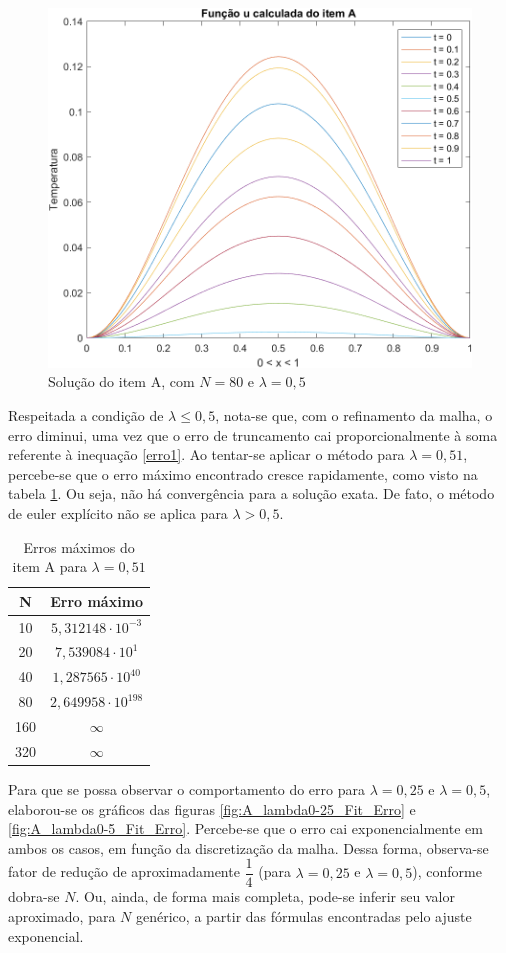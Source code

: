 \documentclass[12pt]{article}
\begin{document}
\begin{spacing}{1.5}
\newpage
\begin{figure}[ht!]
    \centering
    \includegraphics[width=0.5\linewidth]{Primeira_Tarefa/ItemA/itemA_2D.png}
    \caption{Solução do item A, com $N=80$ e $\lambda=0,5$}
    \label{fig:itemA_2D}
\end{figure}

Respeitada a condição de $\lambda \leq 0,5$, nota-se que, com o refinamento da malha, o erro diminui, uma vez que o erro de truncamento cai proporcionalmente à soma referente à inequação \eqref{erro1}. Ao tentar-se aplicar o método para $\lambda = 0,51$, percebe-se que o erro máximo encontrado cresce rapidamente, como visto na tabela \ref{table:A_erro_lambda0-51}. Ou seja, não há convergência para a solução exata. De fato, o método de euler explícito não se aplica para $\lambda > 0,5$.

\begin{table}[ht]
\centering 
\begin{tabular}{c c} 
\hline\hline 
\rule{0pt}{3ex} 
N & Erro máximo\\ [0.5ex] 
\hline 
\rule{0pt}{4ex}
        10  & $5,312148 \cdot 10^{-3}$  \\ 
        20  & $7,539084 \cdot 10^{1}$   \\ 
        40  & $1,287565 \cdot 10^{40}$  \\ 
        80  & $2,649958 \cdot 10^{198}$ \\ 
        160 & $\infty$                  \\ 
        320 & $\infty$                  \\ [1ex]
\hline
\end{tabular}
\caption{Erros máximos do item A para $\lambda = 0,51$} 
\label{table:A_erro_lambda0-51}
\end{table}

Para que se possa observar o comportamento do erro para $\lambda = 0,25$ e $\lambda = 0,5$, elaborou-se os gráficos das figuras \ref{fig:A_lambda0-25_Fit_Erro} e \ref{fig:A_lambda0-5_Fit_Erro}. Percebe-se que o erro cai exponencialmente em ambos os casos, em função da discretização da malha. Dessa forma, observa-se fator de redução de aproximadamente $\dfrac{1}{4}$ (para $\lambda = 0,25$ e $\lambda = 0,5$), conforme dobra-se $N$. Ou, ainda, de forma mais completa, pode-se inferir seu valor aproximado, para $N$ genérico, a partir das fórmulas encontradas pelo ajuste exponencial.  


\end{spacing}
\end{document}
